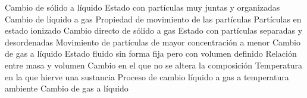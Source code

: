 \documentclass[12pt,addpoints]{repaso}
\begin{document}
\begin{questions}
{\begin{multicols}{2}
			\columnbreak

			\begin{choices}
				\choice Cambio de sólido a líquido
				\choice Estado con partículas muy juntas y organizadas
				\choice Cambio de líquido a gas
				\choice Propiedad de movimiento de las partículas
				\choice Partículas en estado ionizado
				\choice Cambio directo de sólido a gas
				\choice Estado con partículas separadas y desordenadas
				\choice Movimiento de partículas de mayor concentración a menor
				\choice Cambio de gas a líquido
				\choice Estado fluido sin forma fija pero con volumen definido
				\choice Relación entre masa y volumen
				\choice Cambio en el que no se altera la composición
				\choice Temperatura en la que hierve una sustancia
				\choice Proceso de cambio líquido a gas a temperatura ambiente
				\choice Cambio de gas a líquido
			\end{choices}
		\end{multicols}
	}







\end{questions}
\end{document}
